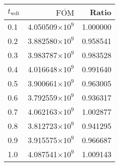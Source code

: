 \begin{tabular}{lrr}
\toprule
$t_{\mathrm{wdt}}$ & $\overline{\mathrm{FOM}}$ &    Ratio \\
\midrule
               0.1 &   4.050509$\times 10^{9}$ & 1.000000 \\
               0.2 &   3.882580$\times 10^{9}$ & 0.958541 \\
               0.3 &   3.983787$\times 10^{9}$ & 0.983528 \\
               0.4 &   4.016648$\times 10^{9}$ & 0.991640 \\
               0.5 &   3.900661$\times 10^{9}$ & 0.963005 \\
               0.6 &   3.792559$\times 10^{9}$ & 0.936317 \\
               0.7 &   4.062163$\times 10^{9}$ & 1.002877 \\
               0.8 &   3.812723$\times 10^{9}$ & 0.941295 \\
               0.9 &   3.915575$\times 10^{9}$ & 0.966687 \\
               1.0 &   4.087541$\times 10^{9}$ & 1.009143 \\
\bottomrule
\end{tabular}
